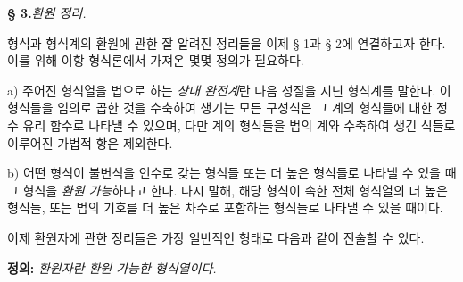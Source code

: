 
\begin{center}
\textbf{§ 3.}\quad \emph{환원 정리.}
\end{center}

형식과 형식계의 환원에 관한 잘 알려진 정리들을 이제 § 1과 § 2에 연결하고자 한다. 이를 위해 이항 형식론에서 가져온 몇몇 정의가 필요하다.

a) 주어진 형식열을 법으로 하는 \emph{상대 완전계}란 다음 성질을 지닌 형식계를 말한다. 이 형식들을 임의로 곱한 것을 수축하여 생기는 모든 구성식은 그 계의 형식들에 대한 정수 유리 함수로 나타낼 수 있으며, 다만 계의 형식들을 법의 계와 수축하여 생긴 식들로 이루어진 가법적 항은 제외한다.

b) 어떤 형식이 불변식을 인수로 갖는 형식들 또는 \glqq{}더 높은 형식들\grqq{}로 나타낼 수 있을 때 그 형식을 \emph{환원 가능}하다고 한다. 다시 말해, 해당 형식이 속한 전체 형식열의 더 높은 형식들, 또는 법의 기호를 더 높은 차수로 포함하는 형식들로 나타낼 수 있을 때이다.

이제 환원자에 관한 정리들은 가장 일반적인 형태로 다음과 같이 진술할 수 있다.

\textbf{정의:} \emph{환원자란 환원 가능한 형식열이다.}
